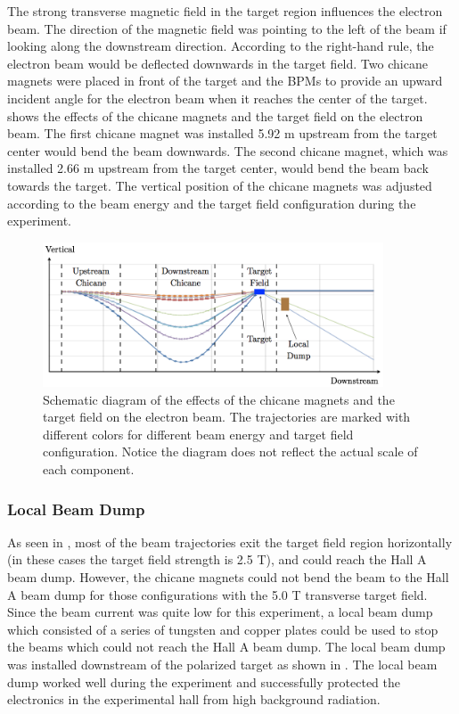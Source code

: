 The strong transverse magnetic field in the target region influences the electron beam. The direction of the magnetic field was pointing to the left of the beam if looking along the downstream direction. According to the right-hand rule, the electron beam would be deflected downwards in the target field. Two chicane magnets were placed in front of the target and the BPMs to provide an upward incident angle for the electron beam when it reaches the center of the target.  shows the effects of the chicane magnets and the target field on the electron beam. The first chicane magnet was installed 5.92 m upstream from the target center would bend the beam downwards. The second chicane magnet, which was installed 2.66 m upstream from the target center, would bend the beam back towards the target. The vertical position of the chicane magnets was adjusted according to the beam energy and the target field configuration during the experiment.

\begin{figure}[b!]
  \centering
  \includegraphics[width=0.9\textwidth]{figs/beam-traj.png}
  \caption[Schematic diagram of the effects of the chicane magnets.]{Schematic diagram of the effects of the chicane magnets and the target field on the electron beam. The trajectories are marked with different colors for different beam energy and target field configuration. Notice the diagram does not reflect the actual scale of each component. \label{C5S2SS5F3}}
\end{figure}

\subsubsection{Local Beam Dump}

As seen in , most of the beam trajectories exit the target field region horizontally (in these cases the target field strength is 2.5 T), and could reach the Hall A beam dump. However, the chicane magnets could not bend the beam to the Hall A beam dump for those configurations with the 5.0 T transverse target field. Since the beam current was quite low for this experiment, a local beam dump which consisted of a series of tungsten and copper plates could be used to stop the beams which could not reach the Hall A beam dump. The local beam dump was installed downstream of the polarized target as shown in . The local beam dump worked well during the experiment and successfully protected the electronics in the experimental hall from high background radiation.

